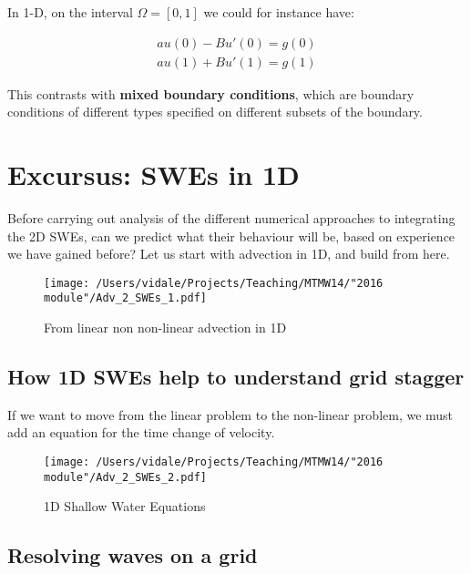 In 1-D, on the interval $\Omega=[0,1]$ we could for instance have:

\begin{eqnarray}
	au(0)-Bu'(0)=g(0) \\
	au(1)+Bu'(1)=g(1)
\end{eqnarray}

This contrasts with \textbf{mixed boundary conditions}, which are boundary conditions of different types specified on different subsets of the boundary.\\

\clearpage

\section{Excursus: SWEs in 1D}

Before carrying out analysis of the different numerical approaches to integrating the 2D SWEs, can we predict what their behaviour will be, based on experience we have gained before? Let us start with advection in 1D, and build from here.

\begin{figure}[h!]
\texttt{[image: /Users/vidale/Projects/Teaching/MTMW14/"2016 module"/Adv\_2\_SWEs\_1.pdf]}
\label{fig:Spherical-PEs1}
\caption{\label{fig:blue_rectangle} From linear non non-linear advection in 1D}
\end{figure}

\subsection{How 1D SWEs help to understand grid stagger} 
If we want to move from the linear problem to the non-linear problem, we must add an equation for the time change of velocity.

\begin{figure}[h!]
\texttt{[image: /Users/vidale/Projects/Teaching/MTMW14/"2016 module"/Adv\_2\_SWEs\_2.pdf]}
\label{fig:Spherical-PEs2}
\caption{\label{fig:blue_rectangle} 1D Shallow Water Equations}
\end{figure}

\subsection{Resolving waves on a grid} 

